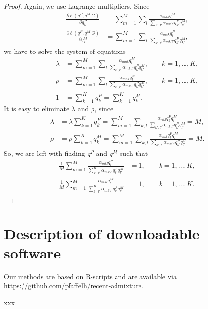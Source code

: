 \documentclass[12pt]{article}
\theoremstyle{definition}
\begin{document}
\begin{proof}
  Again, we use Lagrange multipliers. Since
  \begin{align*}
    \frac{\partial \ell(q^P, q^M|G)}{\partial q^P_k}
    & = \sum_{m=1}^M \sum_l \frac{\alpha_{mak}q_l^M}{\sum_{k',l'} \alpha_{mk'l'}q^P_{k'}q^M_{k'}},
    \\
    \frac{\partial \ell(q^P, q^M|G)}{\partial q^M_k}
    & = \sum_{m=1}^M \sum_l \frac{\alpha_{mak}q_l^P}{\sum_{k',l'} \alpha_{mk'l'}q^P_{k'}q^M_{k'}},
  \end{align*}
  we have to solve the system of equations
  \begin{align}\label{eq:1}
    \lambda & = \sum_{m=1}^M \sum_l \frac{\alpha_{mak}q_l^M}{\sum_{k',l'} \alpha_{mk'l'}q^P_{k'}q^M_{k'}}, \qquad k=1,...,K,\\
    \rho & = \sum_{m=1}^M \sum_l \frac{\alpha_{mak}q_l^P}{\sum_{k',l'} \alpha_{mk'l'}q^P_{k'}q^M_{k'}}, \qquad k=1,...,K,
    \\\label{eq:2}
    1 & = \sum_{k=1}^K q^P_k = \sum_{k=1}^K q^M_k.
  \end{align}
  It is easy to eliminate $\lambda$ and $\rho$, since
  \begin{align*}
    \lambda & = \lambda \sum_{k=1}^K q^P_k = \sum_{m=1}^M \sum_{k,l}
              \frac{\alpha_{mkl}q^P_kq_l^M}{\sum_{k',l'} \alpha_{mk'l'}q^P_{k'}q_{l'}^M} = M,
    \\
    \rho & = \rho \sum_{k=1}^K q_k^M = \sum_{m=1}^M \sum_{k,l}
           \frac{\alpha_{mkl}q^P_kq_l^M}{\sum_{k',l'} \alpha_{mk'l'}q^P_{k'}q_{l'}^M} = M.    
  \end{align*}
  So, we are left with finding $q^P$ and $q^M$ such that
  \begin{align}\label{eq:1}
    \frac{1}{M}\sum_{m=1}^M \frac{\alpha_{mkl}q_l^P}{\sum_{k',l'}^K \alpha_{mk'l'}q^P_{k'} q^M_{l'}} & = 1, \qquad k=1,...,K,
    \\ \frac{1}{M}\sum_{m=1}^M \frac{\alpha_{mkl}q_l^M}{\sum_{k',l'}^K \alpha_{mk'l'}q^P_{k'} q^M_{l'}} & = 1, \qquad k=1,...,K.
  \end{align}
\end{proof}

\section{Description of downloadable software}
Our methods are based on R-scripts and are available via \url{
  https://github.com/pfaffelh/recent-admixture}.

xxx
\end{document}
